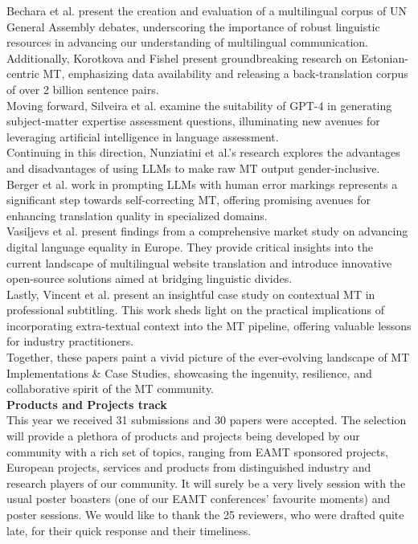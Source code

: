 Bechara et al. present the creation and evaluation of a multilingual corpus of UN General Assembly debates, underscoring the importance of robust linguistic resources in advancing our understanding of multilingual communication.
\\

Additionally, Korotkova and Fishel present groundbreaking research on Estonian-centric MT, emphasizing data availability and releasing a back-translation corpus of over 2 billion sentence pairs.
\\

Moving forward, Silveira et al. examine the suitability of GPT-4 in generating subject-matter expertise assessment questions, illuminating new avenues for leveraging artificial intelligence in language assessment.
\\

Continuing in this direction, Nunziatini et al.'s research explores the advantages and disadvantages of using LLMs to make raw MT output gender-inclusive.
\\

Berger et al. work in prompting LLMs with human error markings represents a significant step towards self-correcting MT, offering promising avenues for enhancing translation quality in specialized domains.
\\

Vasiļjevs et al. present findings from a comprehensive market study on advancing digital language equality in Europe. They provide critical insights into the current landscape of multilingual website translation and introduce innovative open-source solutions aimed at bridging linguistic divides.
\\

Lastly, Vincent et al. present an insightful case study on contextual MT in professional subtitling. This work sheds light on the practical implications of incorporating extra-textual context into the MT pipeline, offering valuable lessons for industry practitioners.
\\

Together, these papers paint a vivid picture of the ever-evolving landscape of MT Implementations \& Case Studies, showcasing the ingenuity, resilience, and collaborative spirit of the MT community.
\\

{\bf Products and Projects track} 
\\

This year we received 31 submissions and 30 papers were accepted. The selection will provide a plethora of products and projects being developed by our community with a rich set of topics, ranging from EAMT sponsored projects, European projects, services and products from distinguished industry and research players of our community. It will surely be a very lively session with the usual poster boasters (one of our EAMT conferences’ favourite moments) and poster sessions. We would like to thank the 25 reviewers, who were drafted quite late, for their quick response and their timeliness.

